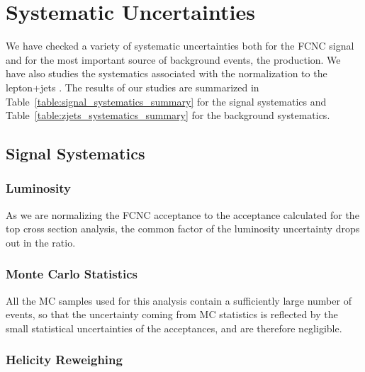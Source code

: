 \section{Systematic Uncertainties}
\label{section:systematics}

We have checked a variety of systematic uncertainties both for the
FCNC signal and for the most important source of background events,
the \Zj production. We have also studies the systematics associated 
with the normalization to the lepton+jets \xsect.  The results of our 
studies are summarized in Table~\ref{table:signal_systematics_summary} for the signal
systematics and Table~\ref{table:zjets_systematics_summary} for the
\Zj background systematics.

\subsection{Signal Systematics}

\subsubsection{Luminosity}
As we are normalizing the FCNC acceptance to the acceptance calculated for
the top cross section analysis, the common factor of the luminosity uncertainty
drops out in the ratio.

\subsubsection{Monte Carlo Statistics}
All the MC samples used for this analysis contain a sufficiently large
number of events, so that the uncertainty coming from MC statistics is
reflected by the small statistical uncertainties of the acceptances, and
are therefore negligible.

\subsubsection{\tZq Helicity Reweighing}
\label{section:helicitysystematics}

